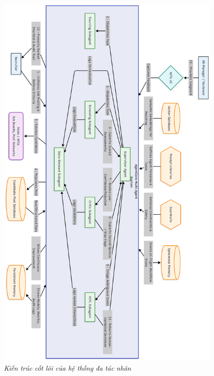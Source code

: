 \documentclass{article}
\begin{document}
\begin{figure}[H]
    \centering
    \includegraphics[width=0.85\linewidth]{img/architecture-diagram.png}
    \caption{\textit{Kiến trúc cốt lõi của hệ thống đa tác nhân}}
    \label{fig:architecture-diagram}
\end{figure}
\end{document}

